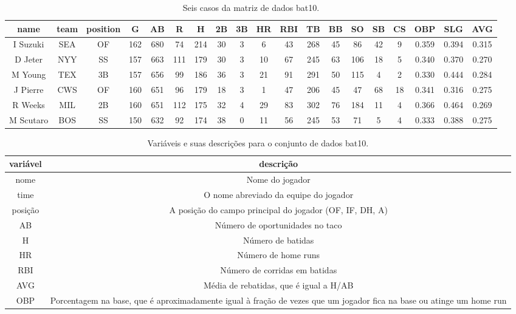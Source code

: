 \documentclass[
]{book}
\theoremstyle{definition}
\theoremstyle{definition}
\theoremstyle{definition}
\theoremstyle{definition}
\theoremstyle{remark}
\begin{document}
\begin{table}

\caption{\label{tab:mlbBat10DataMatrix}Seis casos da matriz de dados bat10.}
\centering
\begin{tabular}[t]{c|c|c|c|c|c|c|c|c|c|c|c|c|c|c|c|c|c|c}
\hline
name & team & position & G & AB & R & H & 2B & 3B & HR & RBI & TB & BB & SO & SB & CS & OBP & SLG & AVG\\
\hline
I Suzuki & SEA & OF & 162 & 680 & 74 & 214 & 30 & 3 & 6 & 43 & 268 & 45 & 86 & 42 & 9 & 0.359 & 0.394 & 0.315\\
\hline
D Jeter & NYY & SS & 157 & 663 & 111 & 179 & 30 & 3 & 10 & 67 & 245 & 63 & 106 & 18 & 5 & 0.340 & 0.370 & 0.270\\
\hline
M Young & TEX & 3B & 157 & 656 & 99 & 186 & 36 & 3 & 21 & 91 & 291 & 50 & 115 & 4 & 2 & 0.330 & 0.444 & 0.284\\
\hline
J Pierre & CWS & OF & 160 & 651 & 96 & 179 & 18 & 3 & 1 & 47 & 206 & 45 & 47 & 68 & 18 & 0.341 & 0.316 & 0.275\\
\hline
R Weeks & MIL & 2B & 160 & 651 & 112 & 175 & 32 & 4 & 29 & 83 & 302 & 76 & 184 & 11 & 4 & 0.366 & 0.464 & 0.269\\
\hline
M Scutaro & BOS & SS & 150 & 632 & 92 & 174 & 38 & 0 & 11 & 56 & 245 & 53 & 71 & 5 & 4 & 0.333 & 0.388 & 0.275\\
\hline
\end{tabular}
\end{table}

\begin{table}

\caption{\label{tab:mlbBat10Variables}Variáveis e suas descrições para o conjunto de dados bat10.}
\centering
\begin{tabular}[t]{c|c}
\hline
variável & descrição\\
\hline
nome & Nome do jogador\\
\hline
time & O nome abreviado da equipe do jogador\\
\hline
posição & A posição do campo principal do jogador (OF, IF, DH, A)\\
\hline
AB & Número de oportunidades no taco\\
\hline
H & Número de batidas\\
\hline
HR & Número de home runs\\
\hline
RBI & Número de corridas em batidas\\
\hline
AVG & Média de rebatidas, que é igual a H/AB\\
\hline
OBP & Porcentagem na base, que é aproximadamente igual à fração de vezes que um jogador fica na base ou atinge um home run\\
\hline
\end{tabular}
\end{table}
\end{document}
